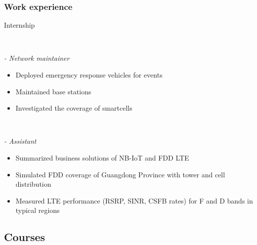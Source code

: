 \documentclass{beamer}
\begin{document}
\begin{frame}
\frametitle{Work experience}

\begin{block}{Internship}

\begin{minipage}[t]{0.7\textwidth}
\end{minipage}
~
\begin{minipage}[t]{0.2\textwidth}
\end{minipage}

\textit{  - Network maintainer}

\begin{itemize}
  \item Deployed emergency response vehicles for events
  \item Maintained base stations
  \item Investigated the coverage of smartcells
\end{itemize}



\begin{minipage}[t]{0.7\textwidth}
\end{minipage}
~
\begin{minipage}[t]{0.2\textwidth}
\end{minipage}

\textit{  - Assistant}

\begin{itemize}
  \item Summarized business solutions of NB-IoT and FDD LTE
  \item Simulated FDD coverage of Guangdong Province with tower and cell distribution
  \item Measured LTE performance (RSRP, SINR, CSFB rates) for F and D bands in typical regions
\end{itemize}

\end{block}

\end{frame}



\subsection{Courses}
\end{document}
